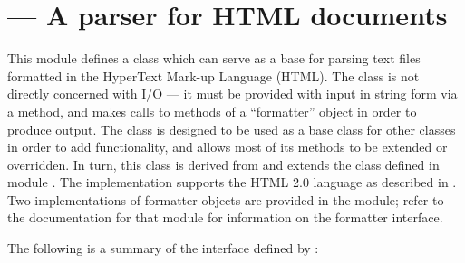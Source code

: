 \section{ ---
         A parser for HTML documents}




This module defines a class which can serve as a base for parsing text
files formatted in the HyperText Mark-up Language (HTML).  The class
is not directly concerned with I/O --- it must be provided with input
in string form via a method, and makes calls to methods of a
``formatter'' object in order to produce output.  The
 class is designed to be used as a base class for
other classes in order to add functionality, and allows most of its
methods to be extended or overridden.  In turn, this class is derived
from and extends the  class defined in module
.  The 
implementation supports the HTML 2.0 language as described in
.  Two implementations of formatter objects are provided in
the  module; refer to the
documentation for that module for information on the formatter
interface.

The following is a summary of the interface defined by
:


